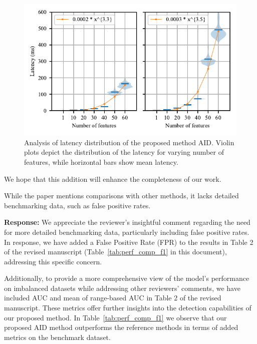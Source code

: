 \documentclass{article}
\makeatletter
\newenvironment{comment}{
\begin{sloppypar}\slshape
\vspace{5 mm}
\color{blue}
 \@beginparpenalty\@M
  \begin{list}{}{\setlength{\topsep}{0ex}%
  \setlength{\leftmargin}{\rightmargin}}\item[]
 \@beginparpenalty\@endparpenalty
}
{\end{list}
\end{sloppypar}
}
\makeatother
\begin{document}
\begin{enumerate}
        \begin{figure}
          \centering
          \includegraphics[width=\textwidth]{scalability.pdf}
          \caption{Analysis of latency distribution of the proposed method AID. Violin plots depict the distribution of the latency for varying number of features, while horizontal bars show mean latency.}
          \label{fig:latency}
        \end{figure}

        We hope that this addition will enhance the completeness of our work.

  \item
        \begin{comment}
        While the paper mentions comparisons with other methods, it lacks detailed benchmarking data, such as false positive rates.
        \end{comment}
        {\bf Response:}
        We appreciate the reviewer's insightful comment regarding the need for more detailed benchmarking data, particularly including false positive rates. In response, we have added a False Positive Rate (FPR) to the results in Table 2 of the revised manuscript (Table~\ref{tab:perf_comp_f1} in this document), addressing this specific concern.

        Additionally, to provide a more comprehensive view of the model's performance on imbalanced datasets while addressing other reviewers' comments, we have included AUC and mean of range-based AUC in Table 2 of the revised manuscript. These metrics offer further insights into the detection capabilities of our proposed method. In Table~\ref{tab:perf_comp_f1} we observe that our proposed AID method outperforms the reference methods in terms of added metrics on the benchmark dataset.


\end{enumerate}
\end{document}
